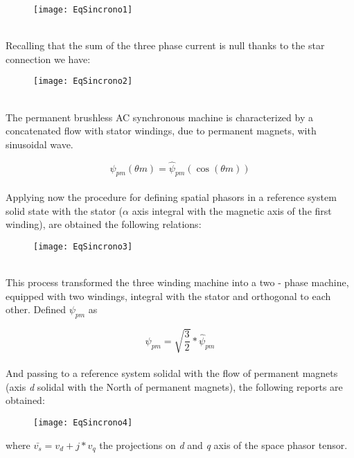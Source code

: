 \documentclass[12pt]{article}
\begin{document}
\begin{figure}[h]
	\centering
	\texttt{[image: EqSincrono1]}
\end{figure}\\

Recalling that the sum of the three phase current is null thanks to the star connection we have:

\begin{figure}[h]
	\centering
	\texttt{[image: EqSincrono2]}
\end{figure}\\

The permanent brushless AC synchronous machine is characterized by a concatenated flow with stator windings, due to permanent magnets, with sinusoidal wave.

\begin{equation}
\psi_{pm}(\theta {m}) = \hat{\psi}_{pm} (\cos(\theta {m}))  
\end{equation}\\

Applying now the procedure for defining spatial phasors in a reference system solid state with the stator ($\alpha$ axis integral with the magnetic axis of the first winding), are obtained the following relations:

\begin{figure}[h]
	\centering
	\texttt{[image: EqSincrono3]}
\end{figure}\\


This process transformed the three winding machine into a two - phase machine, equipped with two windings, integral with the stator and orthogonal to each other.
Defined $\psi_{pm}$  as

\begin{equation}
\psi_{pm}=\sqrt{\frac{3}{2}}*\hat{\psi}_{pm} 
\end{equation}\\


And passing to a reference system solidal with the flow of permanent magnets (axis \textit{d} solidal with the North of permanent magnets), the following reports are obtained:

\begin{figure}[h]
	\centering
	\texttt{[image: EqSincrono4]}
\end{figure}
where $\bar{v_{s}}=v_{d}+j*v_{q}$ the projections on \textit{d} and \textit{q} axis of the space phasor tensor.
\end{document}

